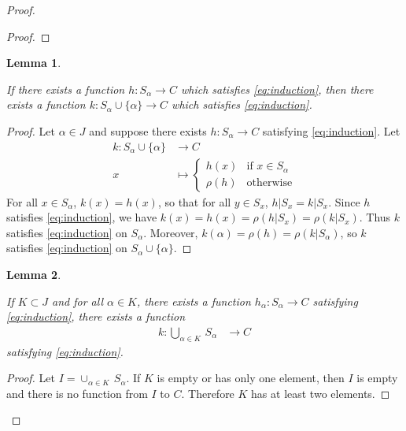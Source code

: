 \documentclass[11pt,a4paper,twoside]{article}
\theoremstyle{definition}
\theoremstyle{plain}
\newtheorem{lemma}{Lemma}
\begin{document}
\begin{proof}
\begin{proof}
\end{proof}

\begin{lemma} \label{lemma:inductive_step}

  If there exists a function $h : S_\alpha \to C$ which satisfies \eqref{eq:induction}, then there exists a function
  $k : S_\alpha \cup \{ \alpha \} \to C$ which satisfies \eqref{eq:induction}.

\end{lemma}

\begin{proof}

  Let $\alpha \in J$ and suppose there exists $h : S_\alpha \to C$ satisfying \eqref{eq:induction}. Let
  \begin{align*} \label{eq:induction}
    k : S_\alpha \cup \{ \alpha \} &\to C \\
    x &\mapsto \begin{cases}
      h ( x ) &\text{if } x \in S_\alpha \\
      \rho ( h ) &\text{otherwise}
    \end{cases}
  \end{align*}
  For all $x \in S_\alpha$, $k ( x ) = h ( x )$, so that for all $y \in S_x$, $h | S_x = k | S_x$. Since $h$ satisfies \eqref{eq:induction},
  we have $k ( x ) = h ( x ) = \rho ( h | S_x ) = \rho ( k | S_x )$. Thus $k$ satisfies \eqref{eq:induction} on $S_\alpha$.
  Moreover, $k ( \alpha ) = \rho ( h ) = \rho ( k | S_\alpha )$, so $k$ satisfies \eqref{eq:induction} on $S_\alpha \cup \{ \alpha \}$.

\end{proof}

\begin{lemma} \label{lemma:limit_case}

  If $K \subset J$ and for all $\alpha \in K$, there exists a function $h_\alpha : S_\alpha \to C$ satisfying \eqref{eq:induction},
  there exists a function
  \begin{align*}
    k : \bigcup_{\alpha \in K} \,S_\alpha &\to C
  \end{align*}
  satisfying \eqref{eq:induction}.

\end{lemma}

\begin{proof}

  Let $I = \cup_{\alpha \in K} \,S_\alpha$. If $K$ is empty or has only one element, then $I$ is empty and there is no function
  from $I$ to $C$. Therefore $K$ has at least two elements.


\end{proof}
\end{proof}
\end{document}
